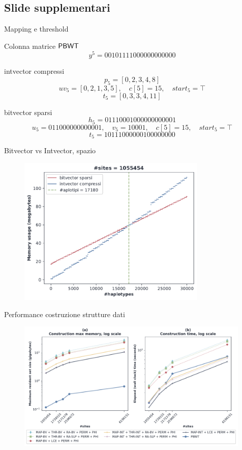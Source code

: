 \documentclass[]{beamer}
\def\PBWT{\mbox{\rm {\sf PBWT}}}
\begin{document}
\subsection{Slide supplementari}
\begin{frame}[plain]{Mapping e threshold}
  \begin{block}{Colonna matrice $\PBWT$}
    \[y^5=00101111000000000000\]
  \end{block}
  \begin{block}{intvector compressi}
    \[p_5=[0,2,3,4,8]\]
    \[uv_5=[0,2,1,3,5],\quad c[5]=15,\quad start_5=\top\]
    \[t_5=[0,3,3,4,11]\]
  \end{block}
  \begin{block}{bitvector sparsi}
    \[h_5=01110001000000000001\]
    \[u_5=011000000000001,\quad v_5=10001,\quad c[5]=15,\quad start_5=\top\]
    \[t_5=10111000000100000000\]
  \end{block}
\end{frame}
\begin{frame}[plain]{Bitvector vs Intvector, spazio}
  \begin{figure}[H]
    \centering
    \hspace{-0.2cm}\includegraphics[width=0.8\textwidth]{img/bv_vs_iv2.pdf}
  \end{figure}
\end{frame}
\begin{frame}[plain]{Performance costruzione strutture dati}
  \begin{figure}[H]
    \centering
    \includegraphics[width=0.99\textwidth]{img/make_time_mem_paper2.pdf}
  \end{figure}
\end{frame}
\end{document}
